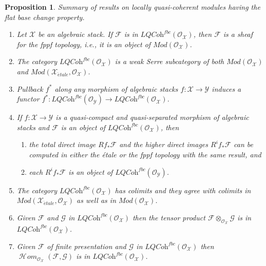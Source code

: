 \documentclass[10pt,a4paper]{amsart}
\theoremstyle{plain}
\newtheorem{proposition}[subsection]{Proposition}
\theoremstyle{definition}
\theoremstyle{remark}
\numberwithin{equation}{subsection}
\def\SheafHom{\mathop{\mathcal{H}\!\mathit{om}}\nolimits}
\def\etale{{\acute{e}tale}}
\begin{document}
\begin{proposition}
\label{proposition-loc-qcoh-flat-base-change}
Summary of results on locally quasi-coherent modules having the flat
base change property.
\begin{enumerate}
\item Let $\mathcal{X}$ be an algebraic stack.
If $\mathcal{F}$ is in $\textit{LQCoh}^{fbc}(\mathcal{O}_\mathcal{X})$,
then $\mathcal{F}$ is a sheaf for the fppf topology, i.e., it is
an object of $\textit{Mod}(\mathcal{O}_\mathcal{X})$.
\item The category $\textit{LQCoh}^{fbc}(\mathcal{O}_\mathcal{X})$
is a weak Serre subcategory of both $\textit{Mod}(\mathcal{O}_\mathcal{X})$
and $\textit{Mod}(\mathcal{X}_\etale, \mathcal{O}_\mathcal{X})$.
\item Pullback $f^*$ along any morphism of algebraic stacks
$f : \mathcal{X} \to \mathcal{Y}$ induces a functor
$f^* : \textit{LQCoh}^{fbc}(\mathcal{O}_\mathcal{Y}) \to
\textit{LQCoh}^{fbc}(\mathcal{O}_\mathcal{X})$.
\item If $f : \mathcal{X} \to \mathcal{Y}$ is a
quasi-compact and quasi-separated morphism of algebraic stacks
and $\mathcal{F}$ is an object of
$\textit{LQCoh}^{fbc}(\mathcal{O}_\mathcal{X})$, then
\begin{enumerate}
\item the total direct image $Rf_*\mathcal{F}$ and the higher direct
images $R^if_*\mathcal{F}$ can be computed in either the \'etale or the
fppf topology with the same result, and
\item each $R^if_*\mathcal{F}$ is an object of
$\textit{LQCoh}^{fbc}(\mathcal{O}_\mathcal{Y})$.
\end{enumerate}
\item The category $\textit{LQCoh}^{fbc}(\mathcal{O}_\mathcal{X})$ has
colimits and they agree with colimits in
$\textit{Mod}(\mathcal{X}_\etale, \mathcal{O}_\mathcal{X})$
as well as in $\textit{Mod}(\mathcal{O}_\mathcal{X})$.
\item Given $\mathcal{F}$ and $\mathcal{G}$ in
$\textit{LQCoh}^{fbc}(\mathcal{O}_\mathcal{X})$ then the tensor product
$\mathcal{F} \otimes_{\mathcal{O}_\mathcal{X}} \mathcal{G}$
is in $\textit{LQCoh}^{fbc}(\mathcal{O}_\mathcal{X})$.
\item Given $\mathcal{F}$ of finite presentation and $\mathcal{G}$ in
$\textit{LQCoh}^{fbc}(\mathcal{O}_\mathcal{X})$ then
$\SheafHom_{\mathcal{O}_\mathcal{X}}(\mathcal{F}, \mathcal{G})$
is in $\textit{LQCoh}^{fbc}(\mathcal{O}_\mathcal{X})$.
\end{enumerate}
\end{proposition}
\end{document}
